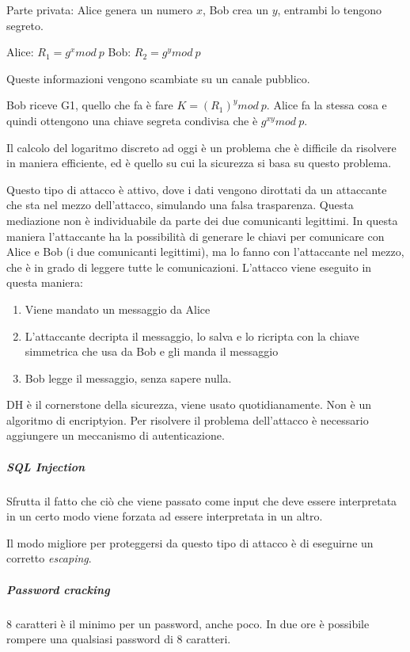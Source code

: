 
Parte privata: Alice genera un numero $x$, Bob crea un $y$, entrambi lo tengono 
segreto.

Alice: $R_1 = g^x mod\ p$
Bob: $R_2 = g^y mod\ p$

Queste informazioni vengono scambiate su un canale pubblico.

Bob riceve G1, quello che fa è fare $K = (R_1)^y mod\ p$. Alice fa la stessa 
cosa e quindi ottengono una chiave segreta condivisa che è $g^{xy} mod\ p$.

Il calcolo del logaritmo discreto ad oggi è un problema che è difficile da 
risolvere in maniera efficiente, ed è quello su cui la sicurezza si basa su 
questo problema.


Questo tipo di attacco è attivo, dove i dati vengono dirottati da un attaccante 
che sta nel mezzo dell'attacco, simulando una falsa trasparenza. Questa 
mediazione non è individuabile da parte dei due comunicanti legittimi. In 
questa maniera l'attaccante ha la possibilità di generare le chiavi per 
comunicare con Alice e Bob (i due comunicanti legittimi), ma lo fanno con 
l'attaccante nel mezzo, che è in grado di leggere tutte le comunicazioni.
L'attacco viene eseguito in questa maniera:
\begin{enumerate}
\item Viene mandato un messaggio da Alice
\item L'attaccante decripta il messaggio, lo salva e lo ricripta con la chiave 
simmetrica che usa da Bob e gli manda il messaggio
\item Bob legge il messaggio, senza sapere nulla.
\end{enumerate}



DH è il cornerstone della sicurezza, viene usato quotidianamente. Non è un 
algoritmo di encriptyion.
Per risolvere il problema dell'attacco è necessario aggiungere un meccanismo di 
autenticazione.

\subparagraph{SQL Injection}

Sfrutta il fatto che ciò che viene passato come input che deve essere 
interpretata in un certo modo viene forzata ad essere interpretata in un altro.

Il modo migliore per proteggersi da questo tipo di attacco è di eseguirne un 
corretto \textit{escaping}.

\subparagraph{Password cracking}


8 caratteri è il minimo per un password, anche poco. In due ore è possibile 
rompere una qualsiasi password di 8 caratteri.
